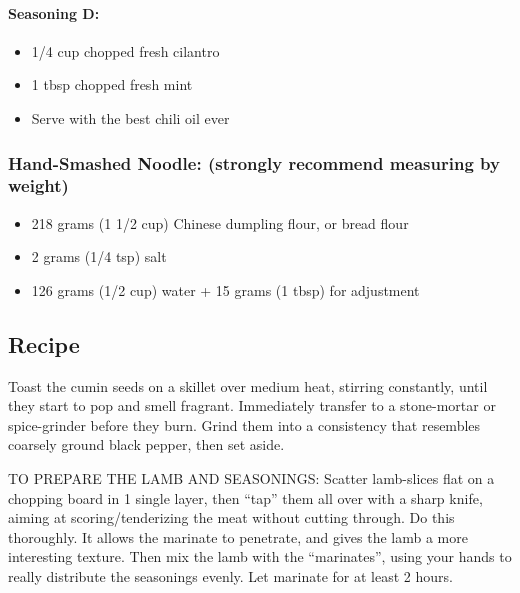 \documentclass[
]{article}
\providecommand{\tightlist}{%
  \setlength{\itemsep}{0pt}\setlength{\parskip}{0pt}}
\begin{document}
\hypertarget{seasoning-d}{%
\paragraph{Seasoning D:}\label{seasoning-d}}

\begin{itemize}
\tightlist
\item
  1/4 cup chopped fresh cilantro
\item
  1 tbsp chopped fresh mint
\item
  Serve with the best chili oil ever
\end{itemize}

\hypertarget{hand-smashed-noodle-strongly-recommend-measuring-by-weight}{%
\subsubsection{Hand-Smashed Noodle: (strongly recommend measuring by weight)}\label{hand-smashed-noodle-strongly-recommend-measuring-by-weight}}

\begin{itemize}
\tightlist
\item
  218 grams (1 1/2 cup) Chinese dumpling flour, or bread flour
\item
  2 grams (1/4 tsp) salt
\item
  126 grams (1/2 cup) water + 15 grams (1 tbsp) for adjustment
\end{itemize}

\hypertarget{recipe-1}{%
\subsection{Recipe}\label{recipe-1}}

Toast the cumin seeds on a skillet over medium heat, stirring constantly, until they start to pop and smell fragrant. Immediately transfer to a stone-mortar or spice-grinder before they burn. Grind them into a consistency that resembles coarsely ground black pepper, then set aside.

TO PREPARE THE LAMB AND SEASONINGS: Scatter lamb-slices flat on a chopping board in 1 single layer, then ``tap'' them all over with a sharp knife, aiming at scoring/tenderizing the meat without cutting through. Do this thoroughly. It allows the marinate to penetrate, and gives the lamb a more interesting texture. Then mix the lamb with the ``marinates'', using your hands to really distribute the seasonings evenly. Let marinate for at least 2 hours.
\end{document}
